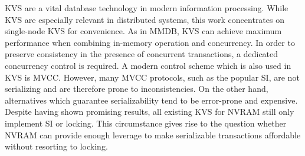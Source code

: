 \ac{KVS} are a vital database technology in modern information processing. While
\ac{KVS} are especially relevant in distributed systems, this work concentrates
on single-node \ac{KVS} for convenience. As in \ac{MMDB}, \ac{KVS} can achieve
maximum performance when combining in-memory operation and concurrency. In order
to preserve consistency in the presence of concurrent transactions, a dedicated
concurrency control is required. A modern control scheme which is also used in
\ac{KVS} is \ac{MVCC}. However, many \ac{MVCC} protocols, such as the popular
\ac{SI}, are not serializing and are therefore prone to inconsistencies. On the
other hand, alternatives which guarantee serializability tend to be error-prone
and expensive. Despite having shown promising results, all existing \ac{KVS} for
\ac{NVRAM} still only implement \ac{SI} or locking. This circumstance gives rise
to the question whether \ac{NVRAM} can provide enough leverage to make
serializable transactions affordable without resorting to locking.
